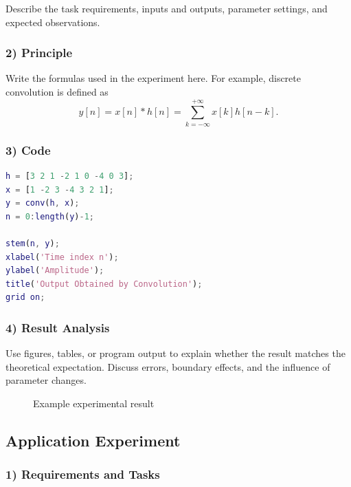 \documentclass[10pt]{article}
\begin{document}
Describe the task requirements, inputs and outputs, parameter settings, and expected observations.

\subsubsection*{2) Principle}

Write the formulas used in the experiment here. For example, discrete convolution is defined as
\begin{equation}
  y[n] = x[n] * h[n] = \sum_{k=-\infty}^{+\infty} x[k]h[n-k].
\end{equation}

\subsubsection*{3) Code}

\begin{lstlisting}[language=Matlab,caption={Discrete convolution example}]
h = [3 2 1 -2 1 0 -4 0 3];
x = [1 -2 3 -4 3 2 1];
y = conv(h, x);
n = 0:length(y)-1;

stem(n, y);
xlabel('Time index n');
ylabel('Amplitude');
title('Output Obtained by Convolution');
grid on;
\end{lstlisting}

\subsubsection*{4) Result Analysis}

Use figures, tables, or program output to explain whether the result matches the theoretical expectation. Discuss errors, boundary effects, and the influence of parameter changes.

\begin{figure}[H]
  \centering
  \caption{Example experimental result}
  \label{fig:result-demo}
\end{figure}

\subsection{Application Experiment}

\subsubsection*{1) Requirements and Tasks}
\end{document}
